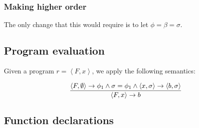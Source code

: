 





\subsubsection{Making \D{} higher order}

The only change that this would require is to let $\phi=\beta=\sigma$.

\subsection{Program evaluation}

Given a program $r=\left\langle F,x \right\rangle$, we apply the following
semantics:

\begin{equation}\label{sem:declaration}
{\displaystyle
    \left\langle F,\emptyset\right\rangle
    \rightarrow
    \phi_1
  \wedge
    \sigma=\phi_1
  \wedge
    \left\langle x,\sigma\right\rangle
    \rightarrow
    \left\langle b,\sigma\right\rangle
\over\displaystyle
  \left\langle F, x\right\rangle
  \rightarrow
  b
}
\end{equation}

\subsection{Function declarations}

